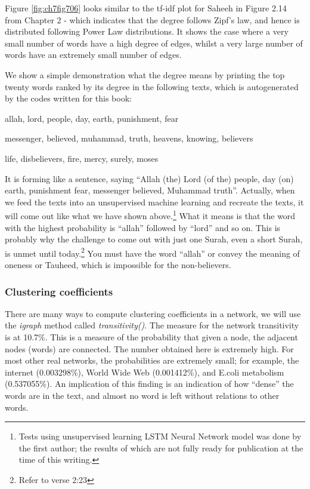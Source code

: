 \documentclass[
]{article}
\begin{document}
Figure \ref{fig:ch7fig706} looks similar to the tf-idf plot for Saheeh in Figure 2.14 from Chapter 2 - which indicates that the degree follows Zipf's law, and hence is distributed following Power Law distributions. It shows the case where a very small number of words have a high degree of edges, whilst a very large number of words have an extremely small number of edges.

We show a simple demonstration what the degree means by printing the top twenty words ranked by its degree in the following texts, which is autogenerated by the codes written for this book:

allah, lord, people, day, earth, punishment, fear

messenger, believed, muhammad, truth, heavens, knowing, believers

life, disbelievers, fire, mercy, surely, moses

It is forming like a sentence, saying ``Allah (the) Lord (of the) people, day (on) earth, punishment fear, messenger believed, Muhammad truth''. Actually, when we feed the texts into an unsupervised machine learning and recreate the texts, it will come out like what we have shown above.\footnote{Tests using unsupervised learning LSTM Neural Network model was done by the first author; the results of which are not fully ready for publication at the time of this writing.} What it means is that the word with the highest probability is ``allah'' followed by ``lord'' and so on. This is probably why the challenge to come out with just one Surah, even a short Surah, is unmet until today.\footnote{Refer to verse 2:23} You must have the word ``allah'' or convey the meaning of oneness or Tauheed, which is impossible for the non-believers.

\hypertarget{clustering-coefficients}{%
\subsubsection{Clustering coefficients}\label{clustering-coefficients}}

There are many ways to compute clustering coefficients in a network, we will use the \emph{igraph} method called \emph{transitivity()}. The measure for the network transitivity is at 10.7\%. This is a measure of the probability that given a node, the adjacent nodes (words) are connected. The number obtained here is extremely high. For most other real networks, the probabilities are extremely small; for example, the internet (0.003298\%), World Wide Web (0.001412\%), and E.coli metabolism (0.537055\%). An implication of this finding is an indication of how ``dense'' the words are in the text, and almost no word is left without relations to other words.
\end{document}
